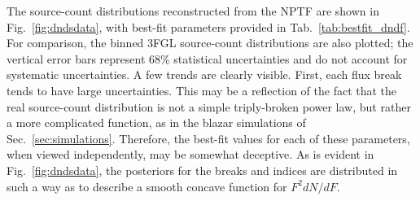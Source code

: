 The source-count distributions reconstructed from the NPTF are shown in Fig.~\ref{fig:dndsdata}, with best-fit parameters provided in Tab.~\ref{tab:bestfit_dndf}.  For comparison, the binned 3FGL source-count distributions are also plotted; the vertical error bars represent 68\% statistical uncertainties  and do not account for systematic uncertainties.  
A few trends are clearly visible.  First, each flux break tends to have large uncertainties.  This may be a reflection of the fact that the real source-count distribution is not a simple triply-broken power law, but rather a more complicated function, as in the blazar simulations of Sec.~\ref{sec:simulations}.  Therefore, the best-fit values for each of these parameters, when viewed independently, may be somewhat deceptive.  As is evident in Fig.~\ref{fig:dndsdata}, the posteriors for the breaks and indices are distributed in such a way as to describe a smooth concave function for $F^2 dN/dF$.  


